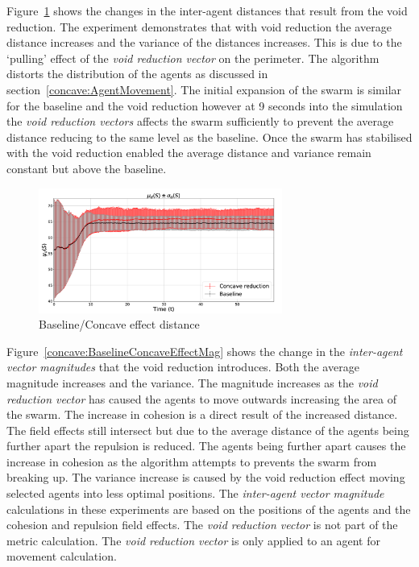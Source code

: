 \documentclass[preprint,12pt]{elsarticle}
\begin{document}
Figure~\ref{concave:BaselineConcaveEffectDist} shows the changes in the inter-agent distances that result from the void reduction. The experiment demonstrates that with void reduction the average distance increases and the variance of the distances increases. This is due to the `pulling' effect of the \textit{void reduction vector} on the perimeter. The algorithm distorts the distribution of the agents as discussed in section~\ref{concave:AgentMovement}. The initial expansion of the swarm is similar for the baseline and the void reduction however at 9 seconds into the simulation the \textit{void reduction vectors} affects the swarm sufficiently to prevent the average distance reducing to the same level as the baseline. Once the swarm has stabilised with the void reduction enabled the average distance and variance remain constant but above the baseline.

\begin{figure}
\begin{center}
\includegraphics[width=8cm]{figures/BaselineConcaveEffectDist}
\end{center}
\caption{Baseline/Concave effect distance \label{concave:BaselineConcaveEffectDist}}
\end{figure}

Figure~\ref{concave:BaselineConcaveEffectMag} shows the change in the \textit{inter-agent vector magnitudes} that the void reduction introduces. Both the average magnitude increases and the variance. The magnitude increases as the \textit{void reduction vector} has caused the agents to move outwards increasing the area of the swarm. The increase in cohesion is a direct result of the increased distance. The field effects still intersect but due to the average distance of the agents being further apart the repulsion is reduced. The agents being further apart causes the increase in cohesion as the algorithm attempts to prevents the swarm from breaking up. The variance increase is caused by the void reduction effect moving selected agents into less optimal positions.
The \textit{inter-agent vector magnitude} calculations in these experiments are based on the positions of the agents and the cohesion and repulsion field effects. The \textit{void reduction vector} is not part of the metric calculation. The \textit{void reduction vector} is only applied to an agent for movement calculation. 
\end{document}
